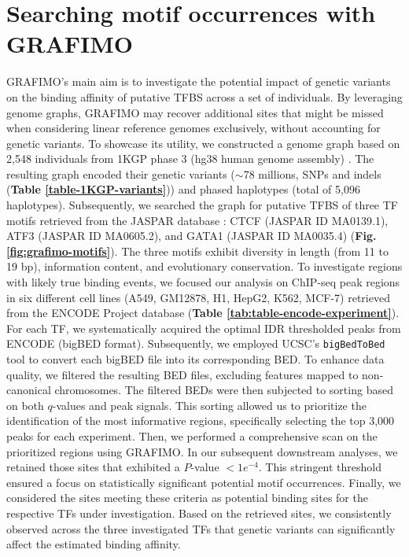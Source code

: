 \documentclass[a4paper, titlepage, openright]{book}
\newcommand{\grafimo}{GRAFIMO\xspace}
\begin{document}
\section{Searching motif occurrences with \grafimo}
\grafimo's main aim is to investigate the potential impact of genetic variants on the binding affinity of putative TFBS across a set of individuals. By leveraging genome graphs, \grafimo may recover additional sites that might be missed when considering linear reference genomes exclusively, without accounting for genetic variants. To showcase its utility, we constructed a genome graph based on 2,548 individuals from 1KGP phase 3 (hg38 human genome assembly) \citep{zheng2017alignment, lowy2019variant}. The resulting graph encoded their genetic variants ($\sim$78 millions, SNPs and indels (\textbf{Table 
\ref{table-1KGP-variants}})) and phased haplotypes (total of 5,096 haplotypes). Subsequently, we searched the graph for putative TFBS of three TF motifs retrieved from the JASPAR database \citep{sandelin2004jaspar, fornes2020jaspar}: CTCF (JASPAR ID MA0139.1), ATF3 (JASPAR ID MA0605.2), and GATA1 (JASPAR ID MA0035.4) (\textbf{Fig.\ref{fig:grafimo-motifs}}). The three motifs exhibit diversity in length (from 11 to 19 bp), information content, and evolutionary conservation. To investigate regions with likely true binding events, we focused our analysis on ChIP-seq peak regions in six different cell lines (A549, GM12878, H1, HepG2, K562, MCF-7) retrieved from the ENCODE Project database \citep{encode2012integrated, davis2018encyclopedia} (\textbf{Table \ref{tab:table-encode-experiment}}). For each TF, we systematically acquired the optimal IDR thresholded peaks from ENCODE (bigBED format). Subsequently, we employed UCSC's \texttt{bigBedToBed} tool \citep{kent2010bigwig} to convert each bigBED file into its corresponding BED. To enhance data quality, we filtered the resulting BED files, excluding features mapped to non-canonical chromosomes. The filtered BEDs were then subjected to sorting based on both $q$-values and peak signals. This sorting allowed us to prioritize the identification of the most informative regions, specifically selecting the top 3,000 peaks for each experiment. Then, we performed a comprehensive scan on the prioritized regions using \grafimo. In our subsequent downstream analyses, we retained those sites that exhibited a $P$-value $< 1e^{-4}$. This stringent threshold ensured a focus on statistically significant potential motif occurrences. Finally, we considered the sites meeting these criteria as potential binding sites for the respective TFs under investigation. Based on the retrieved sites, we consistently observed across the three investigated TFs that genetic variants can significantly affect the estimated binding affinity. 
\end{document}
